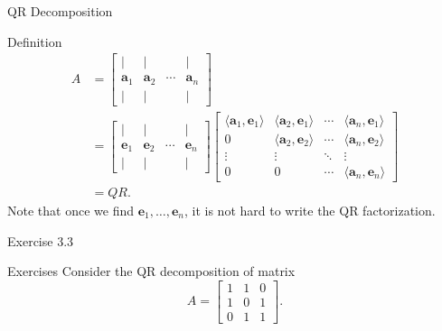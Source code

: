 \documentclass[aspectratio=169, UTF8]{ctexbeamer}
\begin{document}
\begin{frame}{QR Decomposition}
    \begin{block}{Definition}
\begin{equation}
\begin{aligned}
A &= 
\begin{bmatrix}
\vert & \vert & & \vert \\
\mathbf{a}_1 & \mathbf{a}_2 & \cdots & \mathbf{a}_n \\
\vert & \vert & & \vert
\end{bmatrix} \\
&=
\begin{bmatrix}
\vert & \vert & & \vert \\
\mathbf{e}_1 & \mathbf{e}_2 & \cdots & \mathbf{e}_n \\
\vert & \vert & & \vert
\end{bmatrix}
\begin{bmatrix}
\langle \mathbf{a}_1, \mathbf{e}_1 \rangle & \langle \mathbf{a}_2, \mathbf{e}_1 \rangle & \cdots & \langle \mathbf{a}_n, \mathbf{e}_1 \rangle \\
0 & \langle \mathbf{a}_2, \mathbf{e}_2 \rangle & \cdots & \langle \mathbf{a}_n, \mathbf{e}_2 \rangle \\
\vdots & \vdots & \ddots & \vdots \\
0 & 0 & \cdots & \langle \mathbf{a}_n, \mathbf{e}_n \rangle
\end{bmatrix} \\
&= QR.
\end{aligned}
\end{equation}
Note that once we find \(\mathbf{e}_1, \ldots, \mathbf{e}_n\), it is not hard to write the QR factorization.
    \end{block}
\end{frame}

\begin{frame}{Exercise 3.3}
    \begin{block}{Exercises}
        Consider the QR decomposition of matrix
\[
A = \begin{bmatrix}
  1 & 1 & 0 \\
  1 & 0 & 1 \\
  0 & 1 & 1
\end{bmatrix}.
\]
    \end{block}    
\end{frame}
\end{document}
